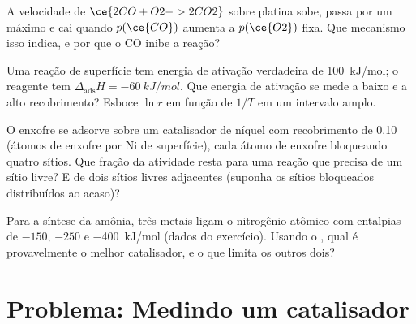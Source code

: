\begin{exercise}[$\star\star$]\label{exo:b3:surfaces-catalysis:9}
A velocidade de $\ce{2 CO + O2 -> 2 CO2}$ sobre platina sobe, passa por um máximo e cai quando
$p(\ce{CO})$ aumenta a $p(\ce{O2})$ fixa. Que mecanismo isso indica, e por que o CO
inibe a reação?
\end{exercise}

\begin{exercise}[$\star\star\star$]\label{exo:b3:surfaces-catalysis:10}
Uma reação de superfície tem energia de ativação verdadeira de \qty{100}{kJ/mol}; o
reagente tem $\Delta_{\mathrm{ads}}H = \qty{-60}{kJ/mol}$. Que energia de ativação se mede a baixo e a
alto recobrimento? Esboce $\ln r$ em função de $1/T$ em um intervalo amplo.
\end{exercise}

\begin{exercise}[$\star\star\star$]\label{exo:b3:surfaces-catalysis:11}
O enxofre se adsorve sobre um catalisador de níquel com recobrimento de 0.10 (átomos
de enxofre por Ni de superfície), cada átomo de enxofre bloqueando quatro sítios. Que
fração da atividade resta para uma reação que precisa de um sítio livre? E de dois
sítios livres adjacentes (suponha os sítios bloqueados distribuídos ao acaso)?
\end{exercise}

\begin{exercise}[$\star\star\star$]\label{exo:b3:surfaces-catalysis:12}
Para a síntese da amônia, três metais ligam o nitrogênio atômico com entalpias de
$-150$, $-250$ e \qty{-400}{kJ/mol} (dados do exercício). Usando o , qual é provavelmente o melhor catalisador, e o que limita os outros dois?
\end{exercise}

\section{Problema: Medindo um catalisador}

